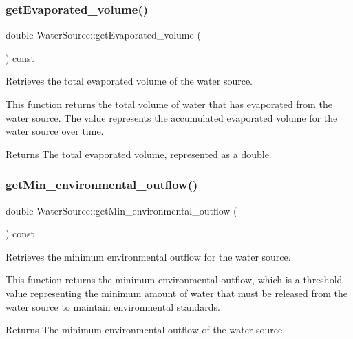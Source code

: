 \subsubsection{\texorpdfstring{get\+Evaporated\+\_\+volume()}{getEvaporated\_volume()}}
{\footnotesize\ttfamily double Water\+Source\+::get\+Evaporated\+\_\+volume (\begin{DoxyParamCaption}{ }\end{DoxyParamCaption}) const}



Retrieves the total evaporated volume of the water source. 

This function returns the total volume of water that has evaporated from the water source. The value represents the accumulated evaporated volume for the water source over time.

\begin{DoxyReturn}{Returns}
The total evaporated volume, represented as a double. 
\end{DoxyReturn}
\mbox{\label{classWaterSource_af7607924825ffe293179b09fe1bc466e}} 
\subsubsection{\texorpdfstring{get\+Min\+\_\+environmental\+\_\+outflow()}{getMin\_environmental\_outflow()}}
{\footnotesize\ttfamily double Water\+Source\+::get\+Min\+\_\+environmental\+\_\+outflow (\begin{DoxyParamCaption}{ }\end{DoxyParamCaption}) const}



Retrieves the minimum environmental outflow for the water source. 

This function returns the minimum environmental outflow, which is a threshold value representing the minimum amount of water that must be released from the water source to maintain environmental standards.

\begin{DoxyReturn}{Returns}
The minimum environmental outflow of the water source. 
\end{DoxyReturn}
\mbox{\label{classWaterSource_a506c77317ae84db0a4d9ea2cd74ddb11}} 
